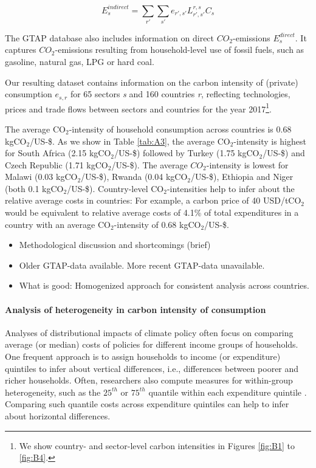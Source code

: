 \documentclass[12pt, a4paper]{article}
\begin{document}
\begin{equation}
    E_{s}^{indirect} = \sum_{r'} \sum_{s'} e_{r',s'} L_{r',s'}^{r,s} C_{s}
\end{equation}

The GTAP database also includes information on direct $CO_{2}$-emissions $E_{s}^{direct}$. It captures $CO_{2}$-emissions resulting from household-level use of fossil fuels, such as gasoline, natural gas, LPG or hard coal.

Our resulting dataset contains information on the carbon intensity of (private) consumption $e_{s,r}$ for 65 sectors \textit{s} and 160 countries \textit{r}, reflecting technologies, prices and trade flows between sectors and countries for the year 2017\footnote{We show country- and sector-level carbon intensities in Figures \ref{fig:B1} to \ref{fig:B4}.}.


The average CO$_{2}$-intensity of household consumption across countries is 0.68 kgCO$_{2}$/US-\$. As we show in Table \ref{tab:A3}, the average CO$_{2}$-intensity is highest for South Africa (2.15 kgCO$_{2}$/US-\$) followed by Turkey (1.75 kgCO$_{2}$/US-\$) and Czech Republic (1.71 kgCO$_{2}$/US-\$). The average $CO_{2}$-intensity is lowest for Malawi (0.03 kgCO$_{2}$/US-\$), Rwanda (0.04 kgCO$_{2}$/US-\$), Ethiopia and Niger (both 0.1 kgCO$_{2}$/US-\$). Country-level CO$_{2}$-intensities help to infer about the relative average costs in countries: For example, a carbon price of 40 USD/tCO$_{2}$ \autocite{Stiglitz.2017} would be equivalent to relative average costs of 4.1\% of total expenditures in a country with an average CO$_{2}$-intensity of 0.68 kgCO$_{2}$/US-\$.

\begin{itemize}
    \item Methodological discussion and shortcomings (brief)
    \item Older GTAP-data available. More recent GTAP-data unavailable.
    \item What is good: Homogenized approach for consistent analysis across countries.
\end{itemize}

\paragraph{Analysis of heterogeneity in carbon intensity of consumption}



Analyses of distributional impacts of climate policy often focus on comparing average (or median) costs of policies for different income groups of households. One frequent approach is to assign households to income (or expenditure) quintiles to infer about vertical differences, i.e., differences between poorer and richer households. Often, researchers also compute measures for within-group heterogeneity, such as the $25^{th}$ or $75^{th}$ quantile within each expenditure quintile \autocite{Cronin.2019, Missbach.2023b}. Comparing such quantile costs across expenditure quintiles can help to infer about horizontal differences.
\end{document}
